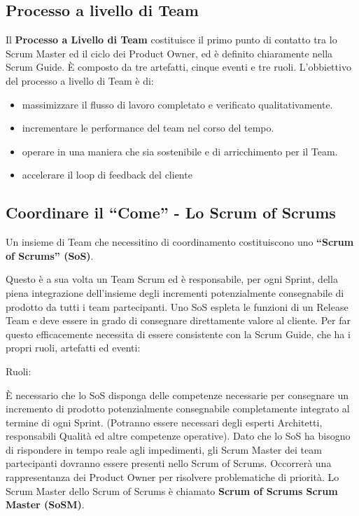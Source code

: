 \documentclass[12pt,a4paper,parskip=full]{scrartcl}
\begin{document}
\subsection{Processo a livello di Team}
Il \textbf{Processo a Livello di Team} costituisce il primo punto di contatto tra lo Scrum Master ed il ciclo dei Product Owner, ed è definito chiaramente nella Scrum Guide. È composto da tre artefatti, cinque eventi e tre ruoli. L'obbiettivo del processo a livello di Team è di:
\begin{itemize}
\item massimizzare il flusso di lavoro completato e verificato qualitativamente.
\item incrementare le performance del team nel corso del tempo.
\item operare in una maniera che sia sostenibile e di arricchimento per il Team.
\item accelerare il loop di feedback del cliente
\end{itemize}

\subsection{Coordinare il ``Come'' - Lo Scrum of Scrums}
Un insieme di Team che necessitino di coordinamento costituiscono uno \textbf{``Scrum of Scrums'' (SoS)}.

Questo è a sua volta un Team Scrum ed è responsabile, per ogni Sprint, della piena integrazione dell'insieme degli incrementi potenzialmente consegnabile di prodotto da tutti i team partecipanti. Uno SoS espleta le funzioni di un Release Team e deve essere in grado di consegnare direttamente valore al cliente. Per far questo efficacemente necessita di essere consistente con la Scrum Guide, che ha i propri ruoli, artefatti ed eventi:

Ruoli:

È necessario che lo SoS disponga delle competenze necessarie per consegnare un incremento di prodotto potenzialmente consegnabile completamente integrato al termine di ogni Sprint. (Potranno essere necessari degli esperti Architetti, responsabili Qualità ed altre competenze operative). Dato che lo SoS ha bisogno di rispondere in tempo reale agli impedimenti, gli Scrum Master dei team partecipanti dovranno essere presenti nello Scrum of Scrums. Occorrerà una rappresentanza dei Product Owner per risolvere problematiche di priorità. Lo Scrum Master dello Scrum of Scrums è chiamato \textbf{Scrum of Scrums Scrum Master (SoSM)}.
\end{document}
